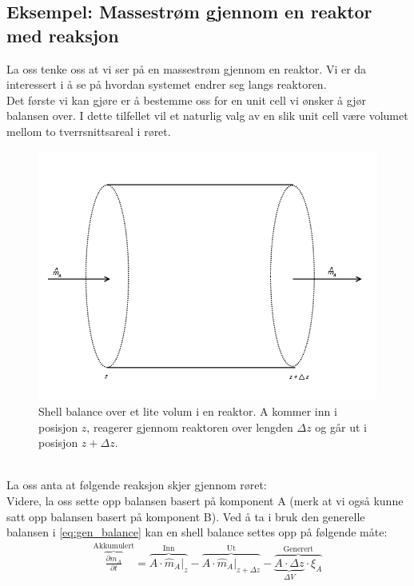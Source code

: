 \subsection{Eksempel: Massestrøm gjennom en reaktor med reaksjon}
La oss tenke oss at vi ser på en massestrøm gjennom en reaktor. Vi er da interessert i å se på hvordan systemet endrer seg langs reaktoren. \\
Det første vi kan gjøre er å bestemme oss for en unit cell vi ønsker å gjør balansen over. I dette tilfellet vil et naturlig valg av en slik unit cell være volumet mellom to tverrsnittsareal i røret. 
\begin{figure}[H]
    \centering
    \includegraphics[scale=0.5]{Figures/shellbalance.png}
    \caption{Shell balance over et lite volum i en reaktor. A kommer inn i posisjon $z$, reagerer gjennom reaktoren over lengden $\Delta z$ og går ut i posisjon $z+\Delta z$.}
    \label{fig:shell_balance}
\end{figure}
\\
La oss anta at følgende reaksjon skjer gjennom røret: \\
Videre, la oss sette opp balansen basert på komponent A (merk at vi også kunne satt opp balansen basert på komponent B). Ved å ta i bruk den generelle balansen i \cref{eq:gen_balance} kan en shell balance settes opp på følgende måte:
\begin{equation}
\begin{split}
\label{eq:shellbal}
    \overbrace{\frac{\partial m_A}{\partial t}}^{\text{Akkumulert}} = \overbrace{A \cdot \hat{m}_A\big|_z}^{\text{Inn}} - \overbrace{A \cdot \hat{m}_A\big|_{z+\Delta z}}^{\text{Ut}} - \overbrace{\underbrace{A \cdot \Delta z}_\text{$\Delta V$} \cdot \xi_A}^{\text{Generert}} 
\end{split}
\end{equation}
